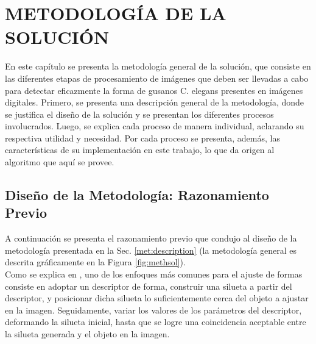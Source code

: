 \thispagestyle{empty}
\cleardoublepage  
\chapter{METODOLOG\'IA DE LA SOLUCI\'ON}
\label{chap:methodology}

En este cap\'itulo se presenta la metodolog\'ia general de la soluci\'on,
que consiste en las diferentes etapas de procesamiento de im\'agenes que deben ser
llevadas a cabo para detectar eficazmente la forma de gusanos C. elegans presentes
en im\'agenes digitales. Primero, se presenta una descripci\'on general de la 
metodolog\'ia, donde se justifica el dise\~no de la soluci\'on y se presentan los 
diferentes procesos involucrados.
Luego, se explica cada proceso de manera individual, aclarando su respectiva utilidad y necesidad.
Por cada proceso se presenta, adem\'as, las caracter\'isticas de su implementaci\'on en este trabajo,
lo que da origen al algoritmo que aqu\'i se provee.

\section{Dise\~no de la Metodolog\'ia: Razonamiento Previo}
\label{sec:reasoning}

A continuaci\'on se presenta el razonamiento previo que condujo al
dise\~no de la metodolog\'ia presentada en la Sec. \ref{met:description}
(la metodolog\'ia general es descrita gr\'aficamente en la Figura \ref{fig:methsol}).\\
 
Como se explica en \cite{binaryshape,deformable,matching2,matchingbook},
uno de los enfoques m\'as comunes para el ajuste de formas consiste en adoptar
un descriptor de forma, construir una silueta a partir del descriptor,
y posicionar dicha silueta lo suficientemente cerca del objeto a ajustar en
la imagen. Seguidamente, variar los valores de los par\'ametros 
del descriptor, deformando la silueta inicial, hasta que se logre una 
coincidencia aceptable entre la silueta generada y el objeto en la imagen.\\
 

